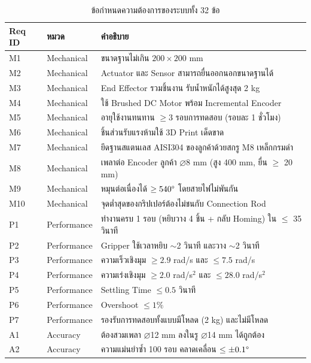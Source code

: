 \begin{table}[H]
  \centering
  \caption{ข้อกำหนดความต้องการของระบบทั้ง 32 ข้อ}
  \label{tab:req_summary}
  \small
  \begin{tabular}{p{1.5cm} p{2.2cm} p{9.8cm}}
    \toprule
    \textbf{Req ID} & \textbf{หมวด} & \textbf{คำอธิบาย} \\
    \midrule
    M1  & Mechanical & ขนาดฐานไม่เกิน $200 \times 200$ mm \\
    M2  & Mechanical & Actuator และ Sensor สามารถยื่นออกนอกขนาดฐานได้ \\
    M3  & Mechanical & End Effector รวมชิ้นงาน รับน้ำหนักได้สูงสุด 2 kg \\
    M4  & Mechanical & ใช้ Brushed DC Motor พร้อม Incremental Encoder \\
    M5  & Mechanical & อายุใช้งานทนทาน $\geq 3$ รอบการทดสอบ (รอบละ 1 ชั่วโมง) \\
    M6  & Mechanical & ชิ้นส่วนรับแรงห้ามใช้ 3D Print เด็ดขาด \\
    M7  & Mechanical & ยึดฐานสแตนเลส AISI304 ของลูกค้าด้วยสกรู M8 เหล็กกรมดำ \\
    M8  & Mechanical & เพลาต่อ Encoder ลูกค้า $\varnothing$8 mm (สูง 400 mm, ยื่น $\geq$ 20 mm) \\
    M9  & Mechanical & หมุนต่อเนื่องได้ $\geq 540\degree$ โดยสายไฟไม่พันกัน \\
    M10 & Mechanical & จุดต่ำสุดของกริปเปอร์ต้องไม่ชนกับ Connection Rod \\
    \midrule
    P1  & Performance & ทำงานครบ 1 รอบ (หยิบวาง 4 ชิ้น + กลับ Homing) ใน $\leq$ 35 วินาที \\
    P2  & Performance & Gripper ใช้เวลาหยิบ $\sim$2 วินาที และวาง $\sim$2 วินาที \\
    P3  & Performance & ความเร็วเชิงมุม $\geq 2.9$ rad/s และ $\leq 7.5$ rad/s \\
    P4  & Performance & ความเร่งเชิงมุม $\geq 2.0$ rad/s$^2$ และ $\leq 28.0$ rad/s$^2$ \\
    P5  & Performance & Settling Time $\leq 0.5$ วินาที \\
    P6  & Performance & Overshoot $\leq 1\%$ \\
    P7  & Performance & รองรับการทดสอบทั้งแบบมีโหลด (2 kg) และไม่มีโหลด \\
    \midrule
    A1  & Accuracy & ต้องสวมเพลา $\varnothing$12 mm ลงในรู $\varnothing$14 mm ได้ถูกต้อง \\
    A2  & Accuracy & ความแม่นยำซ้ำ 100 รอบ คลาดเคลื่อน $\leq \pm 0.1\degree$ \\

\end{tabular}
\end{table}
